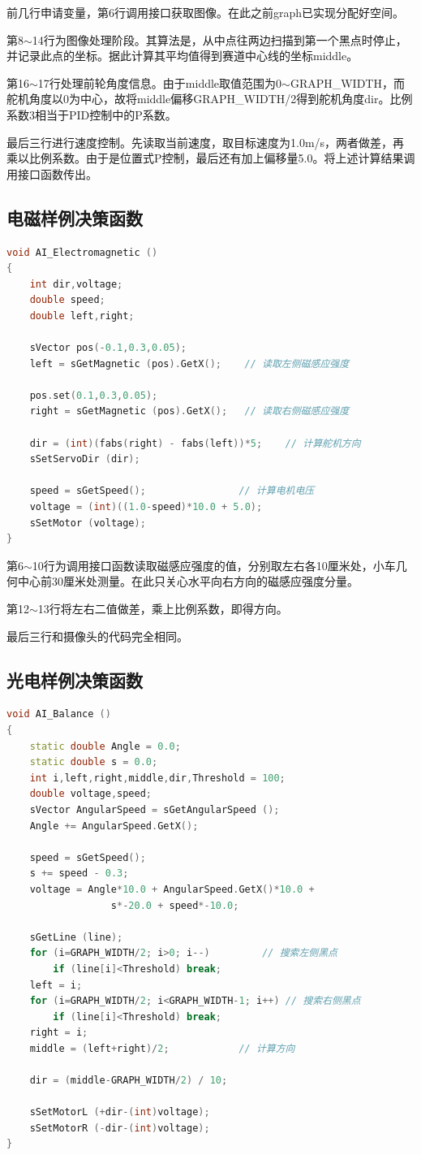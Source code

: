 \documentclass[titlepage,a4paper]{ctexart}
\begin{document}
前几行申请变量，第6行调用接口获取图像。在此之前graph已实现分配好空间。

第8$\sim$14行为图像处理阶段。其算法是，从中点往两边扫描到第一个黑点时停止，并记录此点的坐标。据此计算其平均值得到赛道中心线的坐标middle。

第16$\sim$17行处理前轮角度信息。由于middle取值范围为0$\sim$GRAPH\_WIDTH，而舵机角度以0为中心，故将middle偏移GRAPH\_WIDTH/2得到舵机角度dir。比例系数3相当于PID控制中的P系数。

最后三行进行速度控制。先读取当前速度，取目标速度为1.0m/s，两者做差，再乘以比例系数。由于是位置式P控制，最后还有加上偏移量5.0。将上述计算结果调用接口函数传出。 \\

\newpage
\subsection{电磁样例决策函数}
\begin{lstlisting}[language=C++]
void AI_Electromagnetic ()
{
	int dir,voltage;
	double speed;
	double left,right;

	sVector pos(-0.1,0.3,0.05);
	left = sGetMagnetic (pos).GetX();    // 读取左侧磁感应强度

	pos.set(0.1,0.3,0.05);
	right = sGetMagnetic (pos).GetX();   // 读取右侧磁感应强度

	dir = (int)(fabs(right) - fabs(left))*5;    // 计算舵机方向
	sSetServoDir (dir);

	speed = sGetSpeed();			    // 计算电机电压
	voltage = (int)((1.0-speed)*10.0 + 5.0);
	sSetMotor (voltage);
}
\end{lstlisting}

第6$\sim$10行为调用接口函数读取磁感应强度的值，分别取左右各10厘米处，小车几何中心前30厘米处测量。在此只关心水平向右方向的磁感应强度分量。

第12$\sim$13行将左右二值做差，乘上比例系数，即得方向。

最后三行和摄像头的代码完全相同。 \\

\newpage
\subsection{光电样例决策函数}
\begin{lstlisting}[language=C++]
void AI_Balance ()
{
	static double Angle = 0.0;
	static double s = 0.0;
	int i,left,right,middle,dir,Threshold = 100;
	double voltage,speed;
	sVector AngularSpeed = sGetAngularSpeed ();
	Angle += AngularSpeed.GetX();

	speed = sGetSpeed();
	s += speed - 0.3;
	voltage = Angle*10.0 + AngularSpeed.GetX()*10.0 +
                  s*-20.0 + speed*-10.0;

	sGetLine (line);
	for (i=GRAPH_WIDTH/2; i>0; i--)		    // 搜索左侧黑点
		if (line[i]<Threshold) break;
	left = i;
	for (i=GRAPH_WIDTH/2; i<GRAPH_WIDTH-1; i++) // 搜索右侧黑点
		if (line[i]<Threshold) break;
	right = i;
	middle = (left+right)/2;		    // 计算方向
	
	dir = (middle-GRAPH_WIDTH/2) / 10;

	sSetMotorL (+dir-(int)voltage);
	sSetMotorR (-dir-(int)voltage);
}
\end{lstlisting}
\end{document}

